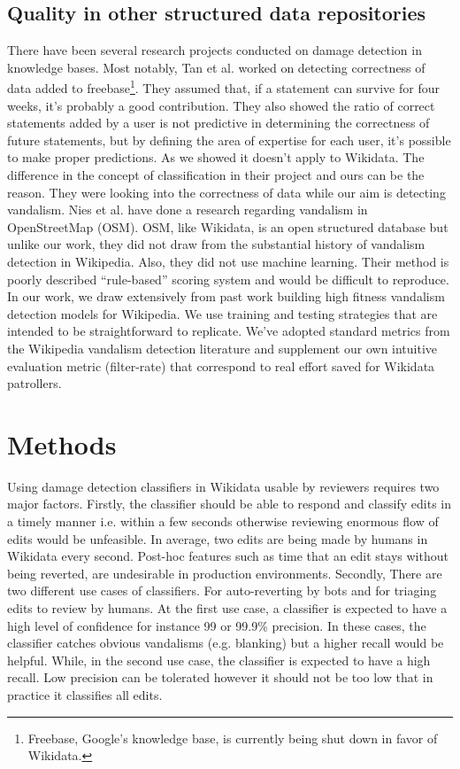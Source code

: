 \documentclass{sig-alternate}
\begin{document}
\subsection{Quality in other structured data repositories}
There have been several research projects conducted on damage detection in knowledge bases. Most notably, Tan et al. \cite{tan:trust} worked on detecting correctness of data added to freebase\footnote{Freebase, Google's knowledge base, is currently being shut down in favor of Wikidata.}. They assumed that, if a statement can survive for four weeks, it's probably a good contribution.  They also showed the ratio of correct statements added by a user is not predictive in determining the correctness of future statements, but by defining the area of expertise for each user, it's possible to make proper predictions. As we showed it doesn't apply to Wikidata. The difference in the concept of classification in their project and ours can be the reason. They were looking into the correctness of data while our aim is detecting vandalism. Nies et al. \cite{neis:towards} have done a research regarding vandalism in OpenStreetMap (OSM). OSM, like Wikidata, is an open structured database but unlike our work, they did not draw from the substantial history of vandalism detection in Wikipedia. Also, they did not use machine learning. Their method is poorly described ``rule-based'' scoring system and would be difficult to reproduce. In our work, we draw extensively from past work building high fitness vandalism detection models for Wikipedia. We use training and testing strategies that are intended to be straightforward to replicate.  We've adopted standard metrics from the Wikipedia vandalism detection literature and supplement our own intuitive evaluation metric (filter-rate) that correspond to real effort saved for Wikidata patrollers.

\section{Methods}
Using damage detection classifiers in Wikidata usable by reviewers requires two major factors. Firstly, the classifier should be able to respond and classify edits in a timely manner i.e. within a few seconds otherwise reviewing enormous flow of edits would be unfeasible. In average, two edits are being made by humans in Wikidata every second. Post-hoc features such as time that an edit stays without being reverted, are undesirable in production environments. Secondly, There are two different use cases of classifiers. For auto-reverting by bots and for triaging edits to review by humans. At the first use case, a classifier is expected to have a high level of confidence for instance 99 or 99.9\% precision. In these cases, the classifier catches obvious vandalisms (e.g. blanking) but a higher recall would be helpful. While, in the second use case, the classifier is expected to have a high recall. Low precision can be tolerated however it should not be too low that in practice it classifies all edits.
\end{document}
